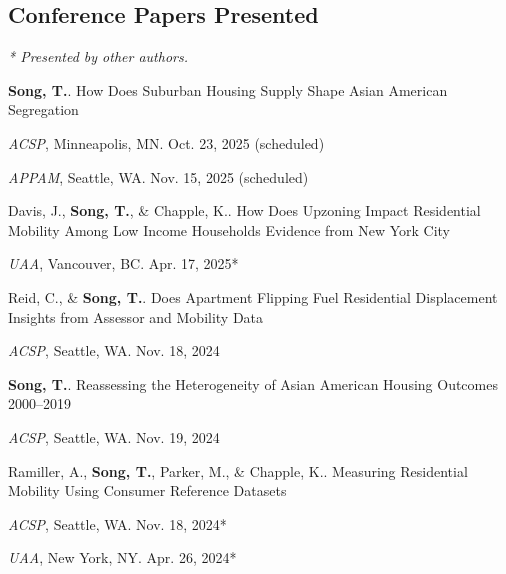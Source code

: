 \documentclass[11pt,letterpaper]{article}
\newcommand{\term}[1]{(#1)}
\begin{document}
\subsection{Conference Papers Presented}
{\footnotesize\emph{* Presented by other authors.}}
\begin{subpoints}
  \item \textbf{Song, T.}. How Does Suburban Housing Supply Shape Asian American Segregation
    \begin{subpoints2}
      \item \emph{ACSP}, Minneapolis, MN. Oct. 23, 2025 \term{scheduled}
      \item \emph{APPAM}, Seattle, WA. Nov. 15, 2025 \term{scheduled}
    \end{subpoints2}

  \item Davis, J., \textbf{Song, T.}, \& Chapple, K.. How Does Upzoning Impact Residential Mobility Among Low Income Households Evidence from New York City
    \begin{subpoints2}
      \item \emph{UAA}, Vancouver, BC. Apr. 17, 2025*
    \end{subpoints2}

  \item Reid, C., \& \textbf{Song, T.}. Does Apartment Flipping Fuel Residential Displacement Insights from Assessor and Mobility Data
    \begin{subpoints2}
      \item \emph{ACSP}, Seattle, WA. Nov. 18, 2024
    \end{subpoints2}

  \item \textbf{Song, T.}. Reassessing the Heterogeneity of Asian American Housing Outcomes 2000–2019
    \begin{subpoints2}
      \item \emph{ACSP}, Seattle, WA. Nov. 19, 2024
    \end{subpoints2}

  \item Ramiller, A., \textbf{Song, T.}, Parker, M., \& Chapple, K.. Measuring Residential Mobility Using Consumer Reference Datasets
    \begin{subpoints2}
      \item \emph{ACSP}, Seattle, WA. Nov. 18, 2024*
      \item \emph{UAA}, New York, NY. Apr. 26, 2024*
    \end{subpoints2}


\end{subpoints}
\end{document}
